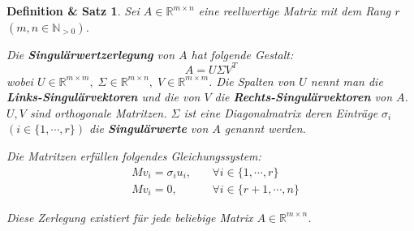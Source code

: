 \documentclass{article}
\newcommand{\R}[0]{\mathbb{R}}
\newtheorem{definthm}{Definition \& Satz}
\begin{document}
\begin{definthm}
    Sei $A \in \R^{m \times n}$ eine reellwertige Matrix mit dem Rang $r$ $(m,n \in \mathbb{N}_{>0})$.

    Die \textbf{Singulärwertzerlegung} von $A$  hat folgende Gestalt:
    \begin{equation}
        A = U \Sigma V^T
    \end{equation}
    wobei $U \in \R^{m \times m}, \; \Sigma \in \R^{m \times n}, \; V \in \R^{m \times m}$.
    Die Spalten von $U$ nennt man die \textbf{Links-Singulärvektoren} und die von $V$ die \textbf{Rechts-Singulärvektoren} von $A$. $U, V$ sind orthogonale Matritzen.
    $\Sigma$ ist eine Diagonalmatrix deren Einträge $\sigma_i$ $(i \in \{1, \cdots, r\})$ die \textbf{Singulärwerte} von $A$ genannt werden.
    
    Die Matritzen erfüllen folgendes Gleichungssystem:
    \begin{align}
        &Mv_i = \sigma_i u_i, \:&&\forall i \in \{1, \cdots, r\} \\
        &Mv_i = 0, \: &&\forall i \in \{r + 1, \cdots, n\}
    \end{align}

    Diese Zerlegung existiert für jede beliebige Matrix $A \in \R^{m \times n}$.
\end{definthm}
\end{document}
